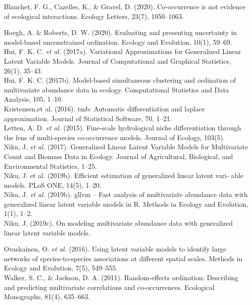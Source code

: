 \documentclass{article}
\begin{document}
Blanchet, F. G., Cazelles, K., \& Gravel, D. (2020). Co-occurrence is not evidence of ecological interactions. Ecology Letters, 23(7), 1050–1063.

Hoegh, A. \& Roberts, D. W. (2020). Evaluating and presenting uncertainty in model-based unconstrained ordination. Ecology and Evolution, 10(1), 59–69.\\

Hui, F. K. C. \textit{et al.} (2017a). Variational Approximations for Generalized Linear Latent Variable Models. Journal of Computational and Graphical Statistics, 26(1), 35–43.\\ 

Hui, F. K. C. (2017b). Model-based simultaneous clustering and ordination of multivariate abundance data in ecology. Computational Statistics and Data Analysis, 105, 1–10. \\

Kristensen,et al. (2016). tmb: Automatic differentiation and laplace approximation. Journal of Statistical Software, 70, 1–21. \\

Letten, A. D. \textit{et al.} (2015). Fine-scale hydrological niche differentiation through the lens of multi-species co-occurrence models. Journal of Ecology, 103(5). \\ 

Niku, J. \textit{et al.} (2017). Generalized Linear Latent Variable Models for Multivariate Count and Biomass Data in Ecology. Journal of Agricultural, Biological, and Environmental Statistics, 1–25. \\

Niku, J. et al. (2019b). Efficient estimation of generalized linear latent vari‐ able models. PLoS ONE, 14(5), 1–20.\\

Niku, J. \textit{et al.} (2019b). gllvm – Fast analysis of multivariate abundance data with generalized linear latent variable models in R. Methods in Ecology and Evolution, 1(1), 1–2. \\

Niku, J. (2019c). On modeling multivariate abundance data with generalized linear latent variable models.

Ovaskainen, O. \textit{et al.} (2016). Using latent variable models to identify large networks of species-to-species associations at different spatial scales. Methods in Ecology and Evolution, 7(5), 549–555. \\

Walker, S. C., \& Jackson, D. A. (2011). Random-effects ordination: Describing and predicting multivariate correlations and co-occurrences. Ecological Monographs, 81(4), 635–663.\\ 
\end{document}
